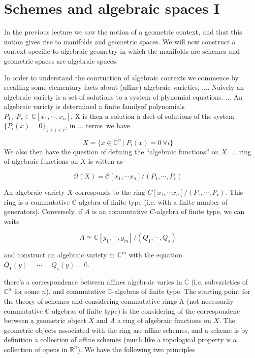 \documentclass[../main.tex]{subfiles}
\begin{document}
\setcounter{chapter}{3}

\chapter{Schemes and algebraic spaces I}

In the previous lecture we saw the notion of a geometric context, and that this notion gives rise to manifolds and geometric spaces. We will now construct a context specific to algebraic geometry in which the manifolds are schemes and geometric spaces are algebraic spaces.


In order to understand the conrtuction of algebraic contexts we commence by recalling some elementary facts about (affine) algebraic varieties, .... Naively an algebraic variety is a set of solutions to a system of plynomial equations. ... An algebraic variety is determined a finite familyof polynomials $P_1, \cdot P_r \in \mathbb C[x_1, \cdots, x_n]$. X is then a solution a dset of solutions of the system $\{P_i(x) = 0\}_{1 \le i \le r}$, in ... terms we have

\[
X = \{ x \in \mathbb C^n ~|~ P_i(x) = 0 ~ \forall i\}
\]
We also then have the question of defining the ``algebraic functions'' on $X$. ... ring of algebraic functions on $X$ is witten as

\[
\mathcal O(X) = \mathcal C[x_1, \cdots x_n] / (P_1, \cdots, P_r)
\]

An algebraic variety $X$ corresponds to the ring $C[x_1, \cdots x_n] / (P_1, \cdots, P_r)$. This ring is a commutative $\mathbb C$-algebra of finite type (i.e. with a finite number of generators). Conversely, if $A$ is an commutative $C$-algebra of finite type, we can write

\[
A \simeq \mathbb C[y_1, \cdots, y_m]/(Q_1, \cdots, Q_s)
\]

and construct an algebraic variety in $\mathbb C^m$ with the equation $Q_1(y) = \cdots = Q_s(y) = 0$.


there's a correspondence between affines algebraic varies in $\mathbb C$ (i.e. subvarieties of $\mathbb C^n$ for some $n$), and commutative $\mathbb C$-algebras of finite type. The starting point for the theory of schemes and considering commutative rings A (not necessarily commutative $\mathbb C$-algebras of finite type) is the considering of the correspondenc between a geometric object $X$ and $A$ a ring of algebraic functions on $X$. The geometric objects associated with the ring are affine schemes, and a scheme is by definition a collection of affine schemes (much like a topological property is a collection of opens in $\mathbb R^n$). We have the following two principles
\end{document}

